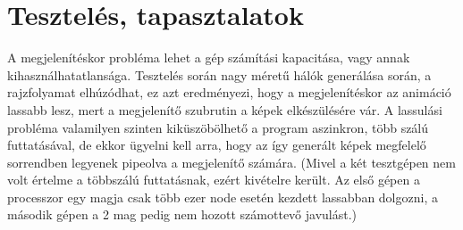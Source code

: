 \section{Tesztelés, tapasztalatok}
A megjelenítéskor probléma lehet a gép számítási kapacitása, vagy annak kihasználhatatlansága. Tesztelés során nagy méretű hálók generálása során, a rajzfolyamat elhúzódhat, ez azt eredményezi, hogy a megjelenítéskor az animáció lassabb lesz, mert a megjelenítő szubrutin a képek elkészülésére vár. A lassulási probléma valamilyen szinten kiküszöbölhető a program aszinkron, több szálú futtatásával, de ekkor ügyelni kell arra, hogy az így generált képek megfelelő sorrendben legyenek pipeolva a megjelenítő számára. (Mivel a két tesztgépen nem volt értelme a többszálú futtatásnak, ezért kivételre került. Az első gépen a processzor egy magja csak több ezer node esetén kezdett lassabban dolgozni, a második gépen a 2 mag pedig nem hozott számottevő javulást.)

